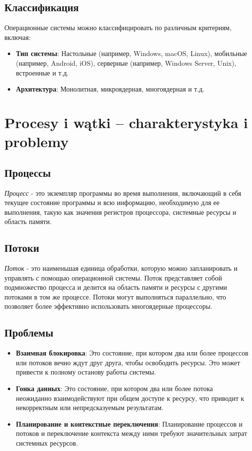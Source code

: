 \subsection{Классификация}

Операционные системы можно классифицировать по различным критериям, включая:

\begin{itemize}
\item \textbf{Тип системы}: Настольные (например, Windows, macOS, Linux), мобильные (например, Android, iOS), серверные (например, Windows Server, Unix), встроенные и т.д.
\item \textbf{Архитектура}: Монолитная, микроядерная, многоядерная и т.д.
\end{itemize}



\section{Procesy i wątki – charakterystyka i problemy}
\subsection{Процессы}

\textit{Процесс} - это экземпляр программы во время выполнения, включающий в себя текущее состояние программы и всю информацию, необходимую для ее выполнения, такую как значения регистров процессора, системные ресурсы и область памяти.

\subsection{Потоки}

\textit{Поток} - это наименьшая единица обработки, которую можно запланировать и управлять с помощью операционной системы. Поток представляет собой подмножество процесса и делится на область памяти и ресурсы с другими потоками в том же процессе. Потоки могут выполняться параллельно, что позволяет более эффективно использовать многоядерные процессоры.

\subsection{Проблемы}

\begin{itemize}
\item \textbf{Взаимная блокировка}: Это состояние, при котором два или более процессов или потоков вечно ждут друг друга, чтобы освободить ресурсы. Это может привести к полному останову работы системы.
\item \textbf{Гонка данных}: Это состояние, при котором два или более потока неожиданно взаимодействуют при общем доступе к ресурсу, что приводит к некорректным или непредсказуемым результатам.
\item \textbf{Планирование и контекстные переключения}: Планирование процессов и потоков и переключение контекста между ними требуют значительных затрат системных ресурсов.
\end{itemize}

